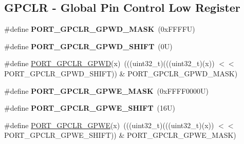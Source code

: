\subsection*{G\+P\+C\+LR -\/ Global Pin Control Low Register}
\begin{DoxyCompactItemize}
\item 
\mbox{\label{group___p_o_r_t___register___masks_gaa7e4a890e9d09d85279889ce3ecb0044}} 
\#define {\bfseries P\+O\+R\+T\+\_\+\+G\+P\+C\+L\+R\+\_\+\+G\+P\+W\+D\+\_\+\+M\+A\+SK}~(0x\+F\+F\+F\+F\+U)
\item 
\mbox{\label{group___p_o_r_t___register___masks_gaafacaac0aa215f596b947609857d6491}} 
\#define {\bfseries P\+O\+R\+T\+\_\+\+G\+P\+C\+L\+R\+\_\+\+G\+P\+W\+D\+\_\+\+S\+H\+I\+FT}~(0\+U)
\item 
\#define \mbox{\hyperlink{group___p_o_r_t___register___masks_gae13a63b19950557e19c9a884f3d3b77a}{P\+O\+R\+T\+\_\+\+G\+P\+C\+L\+R\+\_\+\+G\+P\+WD}}(x)~(((uint32\+\_\+t)(((uint32\+\_\+t)(x)) $<$$<$ P\+O\+R\+T\+\_\+\+G\+P\+C\+L\+R\+\_\+\+G\+P\+W\+D\+\_\+\+S\+H\+I\+FT)) \& P\+O\+R\+T\+\_\+\+G\+P\+C\+L\+R\+\_\+\+G\+P\+W\+D\+\_\+\+M\+A\+SK)
\item 
\mbox{\label{group___p_o_r_t___register___masks_ga49c4160370859546837be80a2eed1365}} 
\#define {\bfseries P\+O\+R\+T\+\_\+\+G\+P\+C\+L\+R\+\_\+\+G\+P\+W\+E\+\_\+\+M\+A\+SK}~(0x\+F\+F\+F\+F0000\+U)
\item 
\mbox{\label{group___p_o_r_t___register___masks_ga340d6aadd9516b3cac26187b014ce9d3}} 
\#define {\bfseries P\+O\+R\+T\+\_\+\+G\+P\+C\+L\+R\+\_\+\+G\+P\+W\+E\+\_\+\+S\+H\+I\+FT}~(16\+U)
\item 
\#define \mbox{\hyperlink{group___p_o_r_t___register___masks_ga52502515ea180d574d919f0ec155da74}{P\+O\+R\+T\+\_\+\+G\+P\+C\+L\+R\+\_\+\+G\+P\+WE}}(x)~(((uint32\+\_\+t)(((uint32\+\_\+t)(x)) $<$$<$ P\+O\+R\+T\+\_\+\+G\+P\+C\+L\+R\+\_\+\+G\+P\+W\+E\+\_\+\+S\+H\+I\+FT)) \& P\+O\+R\+T\+\_\+\+G\+P\+C\+L\+R\+\_\+\+G\+P\+W\+E\+\_\+\+M\+A\+SK)
\end{DoxyCompactItemize}

